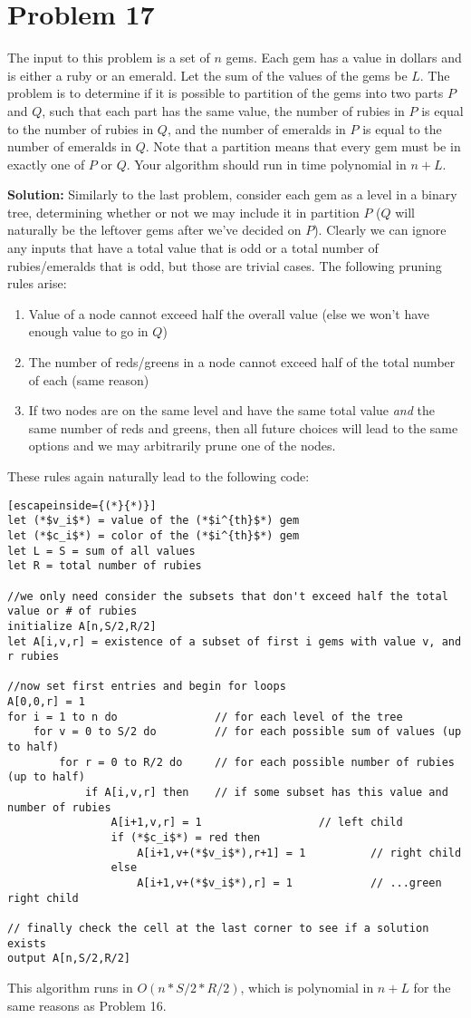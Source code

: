\documentclass{article}
\providecommand{\prob}[1]{\section*{Problem #1}}
\providecommand{\soln}{\textbf{Solution: }}
\begin{document}
\pagebreak
\prob{17}
The input to this problem is a set of $n$ gems. Each gem has a value in dollars and is either a ruby or an emerald. Let the sum of the values of the gems be $L$. The problem is to determine if it is possible to partition of the gems into two parts $P$ and $Q$, such that each part has the same value, the number of rubies in $P$ is equal to the number of rubies in $Q$, and the number of emeralds in $P$ is equal to the number of emeralds in $Q$. Note that a partition means that every gem must be in exactly one of $P$ or $Q$. Your algorithm should run in time polynomial in $n + L$.\par \medskip

\soln Similarly to the last problem, consider each gem as a level in a binary tree, determining whether or not we may include it in partition $P$ ($Q$ will naturally be the leftover gems after we've decided on $P$). Clearly we can ignore any inputs that have a total value that is odd or a total number of rubies/emeralds that is odd, but those are trivial cases. The following pruning rules arise:\par
\begin{enumerate}
    \item Value of a node cannot exceed half the overall value (else we won't have enough value to go in $Q$)
    \item The number of reds/greens in a node cannot exceed half of the total number of each (same reason)
    \item If two nodes are on the same level and have the same total value \emph{and} the same number of reds and greens, then all future choices will lead to the same options and we may arbitrarily prune one of the nodes.
\end{enumerate}
These rules again naturally lead to the following code:\par
\begin{lstlisting}[escapeinside={(*}{*)}]
let (*$v_i$*) = value of the (*$i^{th}$*) gem
let (*$c_i$*) = color of the (*$i^{th}$*) gem
let L = S = sum of all values
let R = total number of rubies

//we only need consider the subsets that don't exceed half the total value or # of rubies
initialize A[n,S/2,R/2]
let A[i,v,r] = existence of a subset of first i gems with value v, and r rubies

//now set first entries and begin for loops
A[0,0,r] = 1
for i = 1 to n do               // for each level of the tree
    for v = 0 to S/2 do         // for each possible sum of values (up to half)
        for r = 0 to R/2 do     // for each possible number of rubies (up to half)
            if A[i,v,r] then    // if some subset has this value and number of rubies
                A[i+1,v,r] = 1                  // left child
                if (*$c_i$*) = red then
                    A[i+1,v+(*$v_i$*),r+1] = 1          // right child
                else
                    A[i+1,v+(*$v_i$*),r] = 1            // ...green right child

// finally check the cell at the last corner to see if a solution exists
output A[n,S/2,R/2]
\end{lstlisting}
This algorithm runs in $O\left(n*S/2*R/2\right)$, which is polynomial in $n+L$ for the same reasons as Problem 16.
\end{document}
